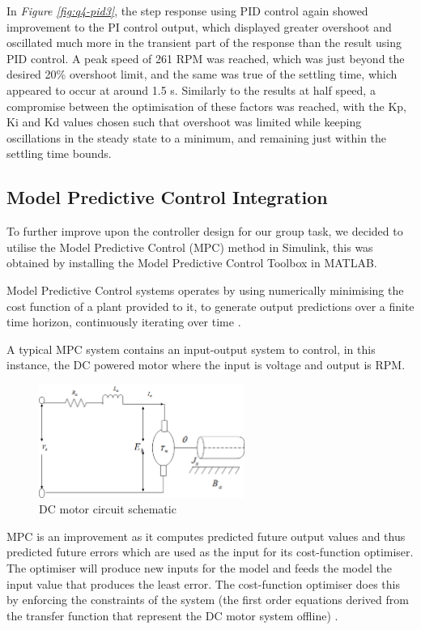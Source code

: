 \documentclass[11pt, onecolumn]{article}
\begin{document}
\par In \textit{Figure \ref{fig:q4-pid3}}, the step response using PID control again showed improvement to the PI control output, which displayed greater overshoot and oscillated much more in the transient part of the response than the result using PID control. A peak speed of 261 RPM was reached, which was just beyond the desired 20\% overshoot limit, and the same was true of the settling time, which appeared to occur at around 1.5 s. Similarly to the results at half speed, a compromise between the optimisation of these factors was reached, with the Kp, Ki and Kd values chosen such that overshoot was limited while keeping oscillations in the steady state to a minimum, and remaining just within the settling time bounds.
\subsection*{Model Predictive Control Integration}
\par To further improve upon the controller design for our group task, we decided to utilise the Model Predictive Control (MPC) method in Simulink, this was obtained by installing the Model Predictive Control Toolbox in MATLAB.
\par Model Predictive Control systems operates by using numerically minimising the cost function of a plant provided to it, to generate output predictions over a finite time horizon, continuously iterating over time \cite{Nikolaou2001}.
\par A typical MPC system contains an input-output system to control, in this instance, the DC powered motor where the input is voltage and output is RPM.
\begin{figure}[h!]
    \centering
    \includegraphics[width=0.6\textwidth]{q4-schematic.png}
    \caption{DC motor circuit schematic \cite{article}}
    \label{fig:q4-schematic}
\end{figure}
\par MPC is an improvement as it computes predicted future output values and thus predicted future errors which are used as the input for its cost-function optimiser. The optimiser will produce new inputs for the model and feeds the model the input value that produces the least error. The cost-function optimiser does this by enforcing the constraints of the system (the first order equations derived from the transfer function that represent the DC motor system offline) \cite{libretexts123MIMO}.
\end{document}
